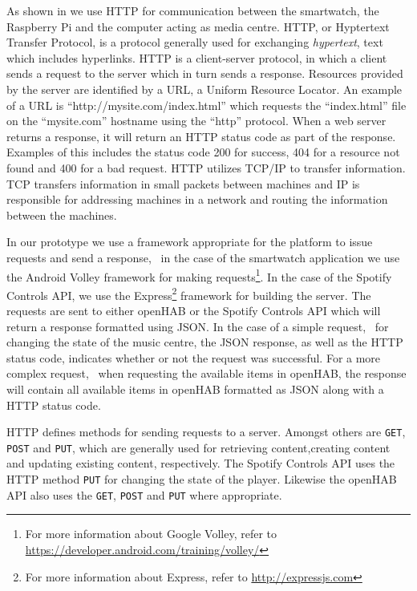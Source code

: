As shown in  we use HTTP for communication between the smartwatch, the Raspberry Pi and the computer acting as media centre. HTTP, or Hyptertext Transfer Protocol, is a protocol generally used for exchanging \emph{hypertext}, text which includes hyperlinks. HTTP is a client-server protocol, in which a client sends a request to the server which in turn sends a response. Resources provided by the server are identified by a URL, a Uniform Resource Locator. An example of a URL is ``http://mysite.com/index.html'' which requests the ``index.html'' file on the ``mysite.com'' hostname using the ``http'' protocol. When a web server returns a response, it will return an HTTP status code as part of the response. Examples of this includes the status code 200 for success, 404 for a resource not found and 400 for a bad request. HTTP utilizes TCP/IP to transfer information. TCP transfers information in small packets between machines and IP is responsible for addressing machines in a network and routing the information between the machines.

In our prototype we use a framework appropriate for the platform to issue requests and send a response, \eg~in the case of the smartwatch application we use the Android Volley framework for making requests\footnote{For more information about Google Volley, refer to \url{https://developer.android.com/training/volley/}}. In the case of the Spotify Controls API, we use the Express\footnote{For more information about Express, refer to \url{http://expressjs.com}} framework for building the server. The requests are sent to either openHAB or the Spotify Controls API which will return a response formatted using JSON. In the case of a simple request, \eg~for changing the state of the music centre, the JSON response, as well as the HTTP status code, indicates whether or not the request was successful. For a more complex request, \eg~when requesting the available items in openHAB, the response will contain all available items in openHAB formatted as JSON along with a HTTP status code.

HTTP defines methods for sending requests to a server. Amongst others are \texttt{GET}, \texttt{POST} and \texttt{PUT}, which are generally used for retrieving content,creating content and updating existing content, respectively. The Spotify Controls API uses the HTTP method \texttt{PUT} for changing the state of the player. Likewise the openHAB API also uses the \texttt{GET}, \texttt{POST} and \texttt{PUT} where appropriate.

